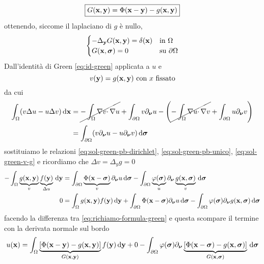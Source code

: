 \begin{equation*}
    \boxed{G(\mathbf{x},\mathbf{y}) =\Phi (\mathbf{x}-\mathbf{y}) -g(\mathbf{x},\mathbf{y})}
\end{equation*}
ottenendo, siccome il laplaciano di $g$ è nullo,
\begin{equation*}
    \begin{cases}
        -\Delta _{\y} G(\x,\y) =\delta (\x) & \text{in} \ \Omega          \\
        G(\x,\sigg) =0                      & \text{su} \ \partial \Omega
    \end{cases}
\end{equation*}
Dall'identità di Green \eqref{eq:id-green} applicata a $u$ e
\begin{equation}
    v(\y) =g(\x,\y) \ \text{con} \ x\ \text{fissato}
    \label{eq:sol-green-v-g}
\end{equation}
da cui
\begin{align*}
    \int _{\Omega }(v\Delta u-u\Delta v) \,\mathrm d \mathbf{x} & =\cancel{-\int _{\Omega } \nabla v\cdotp \nabla u} +\int _{\partial \Omega } v\partial _{\bm{\nu}} u-\left(\cancel{-\int _{\Omega } \nabla u\cdotp \nabla v} +\int _{\partial \Omega } u\partial _{\bm{\nu}} v\right) \\
                                              & =\int _{\partial \Omega }(v\partial _{\bm{\nu}} u-u\partial _{\bm{\nu}} v) \,\mathrm d \bm{\sigma}
\end{align*}
sostituiamo le relazioni \eqref{eq:sol-green-pb-dirichlet}, \eqref{eq:sol-green-pb-unico}, \eqref{eq:sol-green-v-g} e ricordiamo che $\Delta v=\Delta _{y} g=0$
\begin{align*}
    -\int _{\Omega } \underbrace{g(\mathbf{x},\mathbf{y})}_{v} \underbrace{f(\mathbf{y})}_{\Delta u} \,\mathrm d \mathbf{y} & =\int _{\partial \Omega } \underbrace{\Phi (\mathbf{x}-\bm{\sigma})}_{v} \partial _{\bm{\nu}} u\,\mathrm d \bm{\sigma} -\int _{\partial \Omega } \underbrace{\varphi (\bm{\sigma})}_{u} \partial _{\bm{\nu}} \underbrace{g(\mathbf{x},\bm{\sigma})}_{v} \,\mathrm d \bm{\sigma} \\
    0                                                                             & =\int _{\Omega } g(\mathbf{x},\mathbf{y}) f(\mathbf{y}) \,\mathrm d \mathbf{y}+\int _{\partial \Omega } \Phi (\mathbf{x}-\bm{\sigma}) \partial _{\bm{\nu}} u\,\mathrm d \bm{\sigma} -\int _{\partial \Omega } \varphi (\bm{\sigma}) \partial _{\bm{\nu}} g(\mathbf{x},\bm{\sigma}) \,\mathrm d \bm{\sigma}
\end{align*}
facendo la differenza tra \eqref{eq:richiamo-formula-green} e questa scompare il termine con la derivata normale sul bordo
\begin{equation*}
    u(\mathbf{x}) =\int _{\Omega }\underbrace{[ \Phi (\mathbf{x}-\mathbf{y}) -g(\mathbf{x},\mathbf{y})]}_{G(\mathbf{x},\mathbf{y})} f(\mathbf{y}) \,\mathrm d \mathbf{y}+0-\int _{\partial \Omega } \varphi (\bm{\sigma}) \partial_{\bm{\nu}}\underbrace{[ \Phi (\mathbf{x}-\bm{\sigma}) -g(\mathbf{x},\bm{\sigma})]}_{G(\mathbf{x},\bm{\sigma})} \,\mathrm d \bm{\sigma}
\end{equation*}

